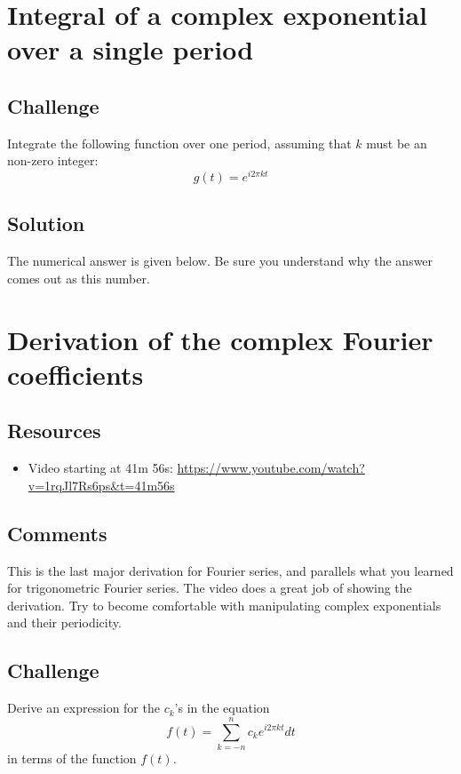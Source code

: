 \newpage
\section{Integral of a complex exponential over a single period}

\subsection*{Challenge}
Integrate the following function over one period, assuming that $k$ must be an non-zero integer:
\begin{equation}
    g(t) = e^{i 2 \pi k t}
\end{equation}

\subsection*{Solution}
The numerical answer is given below. Be sure you understand why the answer comes out as this number.





\newpage
\section{Derivation of the complex Fourier coefficients}

\subsection*{Resources}
\begin{itemize}
    \item Video starting at 41m 56s: \url{https://www.youtube.com/watch?v=1rqJl7Rs6ps&t=41m56s}
\end{itemize}

\subsection*{Comments}
This is the last major derivation for Fourier series, and parallels what you learned for trigonometric Fourier series. The video does a great job of showing the derivation. Try to become comfortable with manipulating complex exponentials and their periodicity.

\subsection*{Challenge}
Derive an expression for the $c_k$'s in the equation
\begin{equation}
    f(t) = \sum_{k=-n}^{n} c_k e^{i 2 \pi k t} dt
\end{equation}
in terms of the function $f(t)$.

